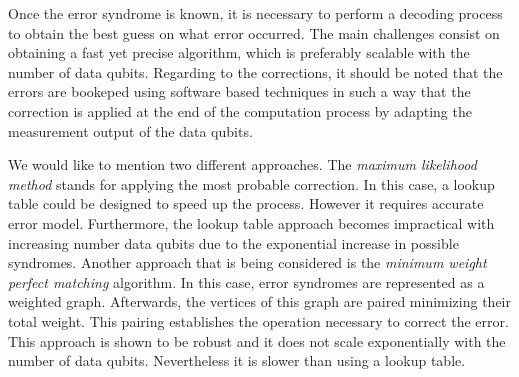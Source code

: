 Once the error syndrome is known, it is necessary to perform a decoding process
to obtain the best guess on what error occurred. The main challenges consist on
obtaining a fast yet precise algorithm, which is preferably scalable with the
number of data qubits. Regarding to the corrections, it should be noted that the
errors are bookeped using software based techniques in such a way that the
correction is applied at the end of the computation process by adapting the
measurement output of the data qubits.

We would like to mention two different approaches. The \textit{maximum
  likelihood method}\cite{} stands for applying the most probable correction. In
this case, a lookup table could be designed to speed up the process. However it
requires accurate error model. Furthermore, the lookup table approach becomes
impractical with increasing number data qubits due to the exponential increase
in possible syndromes. Another approach that is being considered is the
\textit{minimum weight perfect matching}\cite{} algorithm. In this case, error
syndromes are represented as a weighted graph. Afterwards, the vertices of this
graph are paired minimizing their total weight. This pairing establishes the
operation necessary to correct the error. This approach is shown to be robust
and it does not scale exponentially with the number of data qubits. Nevertheless
it is slower than using a lookup table.





